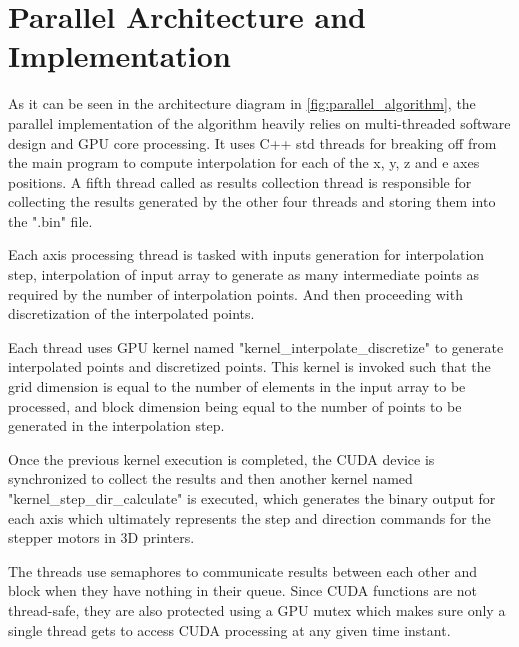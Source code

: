\documentclass[12pt,letterpaper]{article}
\begin{document}
\section{Parallel Architecture and Implementation}

As it can be seen in the architecture diagram in \ref{fig:parallel_algorithm}, the parallel implementation of the algorithm heavily relies on multi-threaded software design and GPU core processing. It uses C++ std threads for breaking off from the main program to compute interpolation for each of the x, y, z and e axes positions. A fifth thread called as results collection thread is responsible for collecting the results generated by the other four threads and storing them into the ".bin" file.

Each axis processing thread is tasked with inputs generation for interpolation step, interpolation of input array to generate as many intermediate points as required by the number of interpolation points. And then proceeding with discretization of the interpolated points.

Each thread uses GPU kernel named "kernel\_interpolate\_discretize" to generate interpolated points and discretized points. This kernel is invoked such that the grid dimension is equal to the number of elements in the input array to be processed, and block dimension being equal to the number of points to be generated in the interpolation step. 

Once the previous kernel execution is completed, the CUDA device is synchronized to collect the results and then another kernel named "kernel\_step\_dir\_calculate" is executed, which generates the binary output for each axis which ultimately represents the step and direction commands for the stepper motors in 3D printers.

The threads use semaphores to communicate results between each other and block when they have nothing in their queue. Since CUDA functions are not thread-safe, they are also protected using a GPU mutex which makes sure only a single thread gets to access CUDA processing at any given time instant.
\end{document}
